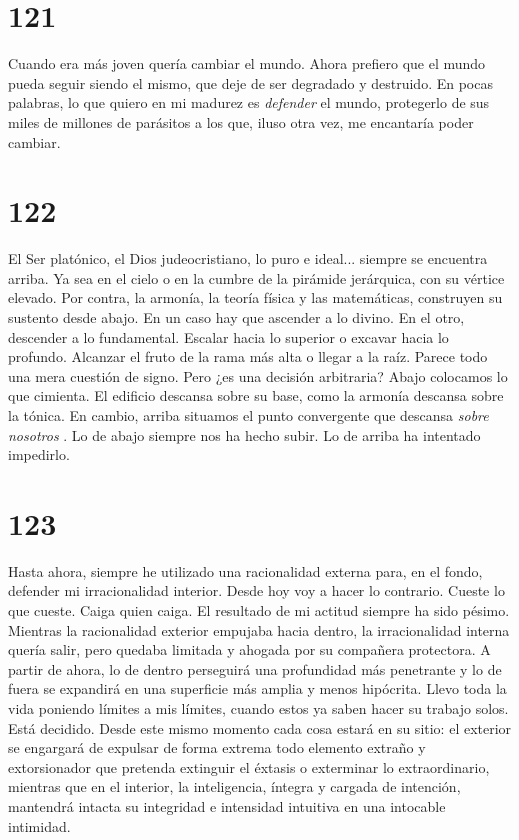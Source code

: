 \documentclass[a4paper,11pt,openright,twocolumn]{book}
\begin{document}
\section*{121}

Cuando era más joven quería cambiar el mundo. Ahora prefiero que el mundo pueda seguir siendo el
mismo, que deje de ser degradado y destruido. En pocas palabras, lo que quiero en mi madurez es
{\it defender}   el mundo, protegerlo de sus miles de millones de parásitos a los que, iluso otra vez,
 me encantaría poder cambiar. 

\section*{122}

El Ser platónico, el Dios judeocristiano, lo puro e ideal... siempre se encuentra arriba. Ya sea 
en el cielo o en la cumbre de la pirámide jerárquica, con su vértice elevado. Por contra, la armonía,
la teoría física y las matemáticas, construyen su sustento desde abajo. En un caso hay que ascender
a lo divino. En el otro, descender a lo fundamental. Escalar hacia lo superior o excavar hacia lo 
profundo. Alcanzar el fruto de la rama más alta o llegar a la raíz. Parece todo una mera cuestión de
signo. Pero ¿es una decisión arbitraria? Abajo colocamos lo que cimienta. El edificio descansa sobre
su base, como la armonía descansa sobre la tónica. En cambio, arriba situamos el punto convergente
que descansa {\it sobre nosotros}  . Lo de abajo siempre nos ha hecho subir. Lo de arriba ha intentado impedirlo.

\section*{123}

Hasta ahora, siempre he utilizado una racionalidad externa para, en el fondo, defender mi irracionalidad
interior. Desde hoy voy a hacer lo contrario. Cueste lo que cueste. Caiga quien caiga. El resultado de
mi actitud siempre ha sido pésimo. Mientras la racionalidad exterior empujaba hacia dentro, la irracionalidad
interna quería salir, pero quedaba limitada y ahogada por su compañera protectora. A partir de ahora, lo
de dentro perseguirá una profundidad más penetrante y lo de fuera se expandirá en una superficie más amplia y
menos hipócrita. Llevo toda la vida poniendo límites a mis límites, cuando estos ya saben hacer su trabajo solos. 
Está decidido. Desde este mismo momento cada cosa estará en su sitio: el exterior se engargará de expulsar de 
forma extrema todo elemento extraño y extorsionador que pretenda extinguir el éxtasis o exterminar lo extraordinario,
mientras que en el interior, la inteligencia, íntegra y cargada de intención, mantendrá intacta su integridad e
intensidad intuitiva en una intocable intimidad.
\end{document}
